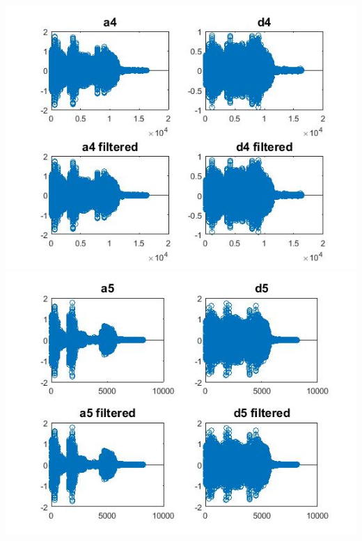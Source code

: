 \documentclass{article}
\begin{document}
\includegraphics[scale=.5]{a4d4}
\includegraphics[scale=.5]{a5d5}
\end{document}
